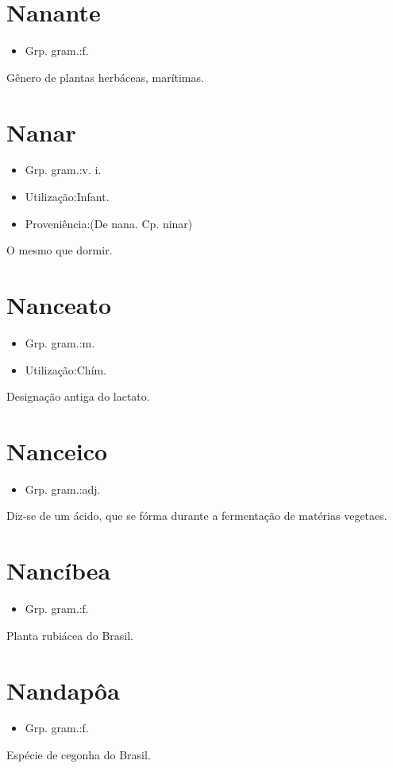 \section{Nanante}
\begin{itemize}
\item {Grp. gram.:f.}
\end{itemize}
Gênero de plantas herbáceas, marítimas.
\section{Nanar}
\begin{itemize}
\item {Grp. gram.:v. i.}
\end{itemize}
\begin{itemize}
\item {Utilização:Infant.}
\end{itemize}
\begin{itemize}
\item {Proveniência:(De \textunderscore nana\textunderscore . Cp. \textunderscore ninar\textunderscore )}
\end{itemize}
O mesmo que \textunderscore dormir\textunderscore .
\section{Nanceato}
\begin{itemize}
\item {Grp. gram.:m.}
\end{itemize}
\begin{itemize}
\item {Utilização:Chím.}
\end{itemize}
Designação antiga do lactato.
\section{Nanceico}
\begin{itemize}
\item {Grp. gram.:adj.}
\end{itemize}
Diz-se de um ácido, que se fórma durante a fermentação de matérias vegetaes.
\section{Nancíbea}
\begin{itemize}
\item {Grp. gram.:f.}
\end{itemize}
Planta rubiácea do Brasil.
\section{Nandapôa}
\begin{itemize}
\item {Grp. gram.:f.}
\end{itemize}
Espécie de cegonha do Brasil.
